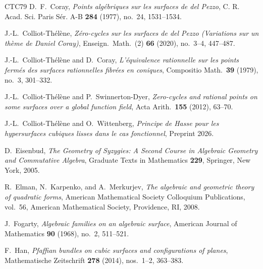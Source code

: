\documentclass[a4paper,11pt]{amsart}
\numberwithin{equation}{section}
\theoremstyle{definition}
\theoremstyle{remark}
\begin{document}
\begin{thebibliography}{CTC79}
D.~F.~Coray,
\emph{Points alg\'ebriques sur les surfaces de del Pezzo},
C. R. Acad. Sci. Paris S\'er. A-B \textbf{284} (1977),
no.~24, 1531--1534.


J.-L.\ Colliot-Th\'el\`ene,
{\em Z\'ero-cycles sur les surfaces de del Pezzo
(Variations sur un th\`eme de Daniel Coray)},
Enseign.\ Math.\ (2) \textbf{66} (2020), no.\ 3--4, 447--487.

J.-L.\ Colliot-Th\'el\`ene and D.\ Coray,
{\em L'\'equivalence rationnelle sur les points ferm\'es
des surfaces rationnelles fibr\'ees en coniques},
Compositio Math.\ \textbf{39} (1979), no.\ 3, 301--332.

J.-L.\ Colliot-Th\'el\`ene and P.\ Swinnerton-Dyer,
{\em Zero-cycles and rational points on some surfaces over a global
function field},
Acta Arith.\ \textbf{155} (2012), 63--70.

J.-L.\ Colliot-Th\'el\`ene and O.\ Wittenberg, {\em Principe de Hasse pour les hypersurfaces cubiques lisses dans le cas fonctionnel}, Preprint 2026.


D.\ Eisenbud, {\em The Geometry of Syzygies: A Second Course in Algebraic Geometry and Commutative Algebra},
Graduate Texts in Mathematics \textbf{229},
Springer, New York, 2005.


R.\ Elman, N.\ Karpenko, and A.\ Merkurjev,
\emph{The algebraic and geometric theory of quadratic forms},
American Mathematical Society Colloquium Publications, vol.~56,
American Mathematical Society, Providence, RI, 2008.

J.\ Fogarty,
\emph{Algebraic families on an algebraic surface},
American Journal of Mathematics \textbf{90} (1968), no.~2, 511--521.

F.\ Han,
\emph{Pfaffian bundles on cubic surfaces and configurations of planes},
Mathematische Zeitschrift \textbf{278} (2014), nos.~1--2, 363--383.



\end{thebibliography}
\end{document}
